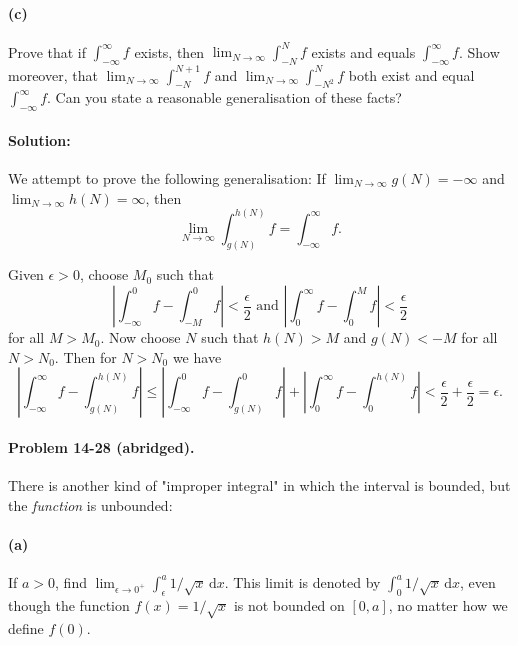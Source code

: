 \documentclass{article}
\begin{document}
\paragraph{(c)} Prove that if $\int_{-\infty}^{\infty} f$ exists, then
$\lim_{N \rightarrow \infty}  \int_{-N}^N f$ exists and equals
$\int_{-\infty}^{\infty} f$. Show moreover, that $\lim_{N \rightarrow \infty}
\int_{-N}^{N + 1} f$ and $\lim_{N \rightarrow \infty} \int_{-N^2}^N f$ both
exist and equal $\int_{-\infty}^{\infty} f$. Can you state a reasonable
generalisation of these facts?

\paragraph{Solution:} We attempt to prove the following generalisation: If
$\lim_{N \rightarrow \infty} g(N) = -\infty$ and
$\lim_{N \rightarrow \infty} h(N) = \infty$, then \begin{equation*}
  \lim_{N \rightarrow \infty} \int_{g(N)}^{h(N)} f = \int_{-\infty}^{\infty} f.
\end{equation*}

Given $\epsilon > 0$, choose $M_0$ such that \begin{equation*}
  \left|\int_{-\infty}^0 f - \int_{-M}^0 f\right| < \frac{\epsilon}{2}
  \text{ and } \left|\int_0^{\infty} f - \int_0^M f\right| < \frac{\epsilon}{2}
\end{equation*} for all $M > M_0$. Now choose $N$ such that $h(N) > M$ and
$g(N) < -M$ for all $N > N_0$. Then for $N > N_0$ we have \begin{equation*}
  \left|\int_{-\infty}^{\infty} f - \int_{g(N)}^{h(N)} f\right|
  \leq \left|\int_{-\infty}^0 f - \int_{g(N)}^0 f\right|
  + \left|\int_0^{\infty} f - \int_0^{h(N)} f\right|
  < \frac{\epsilon}{2} + \frac{\epsilon}{2} = \epsilon.
\end{equation*}

\paragraph{Problem 14-28 (abridged).} There is another kind of "improper
integral" in which the interval is bounded, but the \emph{function} is
unbounded:

\paragraph{(a)} If $a > 0$, find $\lim_{\epsilon \rightarrow 0^+}
\int_{\epsilon}^a 1/\sqrt{x} \,\mathrm{d}x$. This limit is denoted by $\int_0^a
1/\sqrt{x} \,\mathrm{d}x$, even though the function $f(x) = 1/\sqrt{x}$ is not
bounded on $[0, a]$, no matter how we define $f(0)$.
\end{document}
